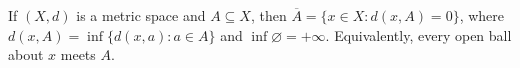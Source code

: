 
If $(X,d)$ is a metric space and $A\subseteq X$, then $\overline A=\{x\in X: d(x,A)=0\}$, where $d(x,A)=\inf\{d(x,a):a\in A\}$ and $\inf\varnothing=+\infty$. Equivalently, every open ball about $x$ meets $A$.
